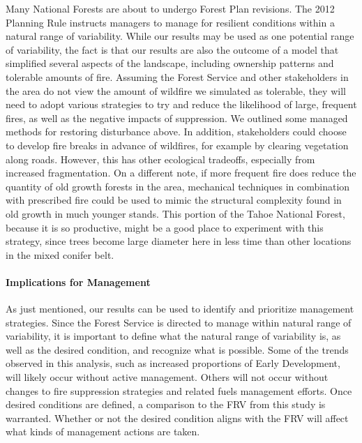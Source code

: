 Many National Forests are about to undergo Forest Plan revisions. The 2012 Planning Rule instructs managers to manage for resilient conditions within a natural range of variability. While our results may be used as one potential range of variability, the fact is that our results are also the outcome of a model that simplified several aspects of the landscape, including ownership patterns and tolerable amounts of fire. Assuming the Forest Service and other stakeholders in the area do not view the amount of wildfire we simulated as tolerable, they will need to adopt various strategies to try and reduce the likelihood of large, frequent fires, as well as the negative impacts of suppression. We outlined some managed methods for restoring disturbance above. In addition, stakeholders could choose to develop fire breaks in advance of wildfires, for example by clearing vegetation along roads. However, this has other ecological tradeoffs, especially from increased fragmentation. On a different note, if more frequent fire does reduce the quantity of old growth forests in the area, mechanical techniques in combination with prescribed fire could be used to mimic the structural complexity found in old growth in much younger stands. This portion of the Tahoe National Forest, because it is so productive, might be a good place to experiment with this strategy, since trees become large diameter here in less time than other locations in the mixed conifer belt.


\paragraph{Implications for Management}
As just mentioned, our results can be used to identify and prioritize management strategies. Since the Forest Service is directed to manage within natural range of variability, it is important to define what the natural range of variability is, as well as the desired condition, and recognize what is possible. Some of the trends observed in this analysis, such as increased proportions of Early Development, will likely occur without active management. Others will not occur without changes to fire suppression strategies and related fuels management efforts. Once desired conditions are defined, a comparison to the FRV from this study is warranted. Whether or not the desired condition aligns with the FRV will affect what kinds of management actions are taken. 


